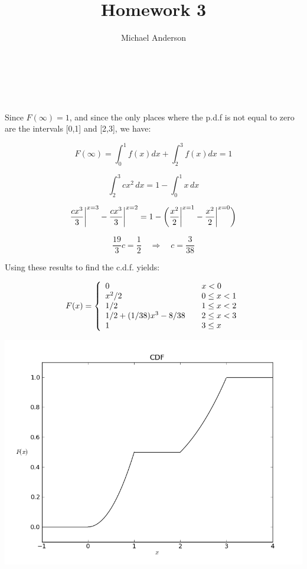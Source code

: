 \documentclass{article}
\author{Michael Anderson}
\title{Homework 3}
\begin{document}
\setlength{\parskip}{1em}
\maketitle
{}
\\
\flushleft
\newpage

\section{}
Since $F(\infty) = 1$, and since the only places where the p.d.f is not equal
to zero are the intervals [0,1] and [2,3], we have:

\[
F(\infty) = \int_0^1 f(x) dx + \int_2^3 f(x) dx = 1
\]

\[
\int_2^3 cx^2 \hspace{2pt} dx = 1 - \int_0^1 x \hspace{2pt} dx
\]

\[
\frac{cx^3}{3} \bigg{|}^{x=3} - \frac{cx^3}{3} \bigg{|}^{x=2} =
1 - \bigg{(}\frac{x^2}{2} \bigg{|}^{x=1} - \frac{x^2}{2} \bigg{|}^{x=0}
\bigg{)}
\]

\[
\frac{19}{3}c = \frac{1}{2} \hspace{1em} \Longrightarrow 
\hspace{1em} c = \frac{3}{38}
\]

Using these results to find the c.d.f. yields:

\[
F(x) = \left\{ \begin{array}{l l}
0 & \quad x < 0\\
x^2/2 & \quad 0 \le x < 1\\
1/2 & \quad 1 \le x < 2\\
1/2 + (1/38)x^3 - 8/38 & \quad 2 \le x < 3\\
1 & \quad 3 \le x
\end{array} \right.
\]

\includegraphics[scale=0.50]{problem1.png}
\end{document}
